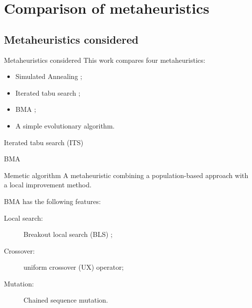 \section{Comparison of metaheuristics} {
    \subsection{Metaheuristics considered} {
        \begin{frame}{Metaheuristics considered}
            This work compares four metaheuristics:
            \begin{itemize}
                \item Simulated Annealing \citep{kirkpatrick:1983op, vcerny:1985th};
                \item Iterated tabu search \citep{Misevicius:2012dj};
                \item BMA \citep{Benlic:2015gp};
                \item A simple evolutionary algorithm.
            \end{itemize}
        \end{frame}

        \begin{frame}{Iterated tabu search (ITS) \citep{Misevicius:2012dj}}

        \end{frame}

        \begin{frame}{BMA \citep{Benlic:2015gp}}
            \begin{block}{Memetic algorithm \citep{Neri:2012jr}}
                A metaheuristic combining a population-based approach with a local improvement method.
            \end{block}

            \vspace{0.8cm}

            BMA has the following features:
            \begin{description}
                \item[Local search:] Breakout local search (BLS) \citep{Benlic:2013gi};
                \item[Crossover:]  uniform crossover (UX) operator;
                \item[Mutation:] Chained sequence mutation.
            \end{description}
        \end{frame}

}}

